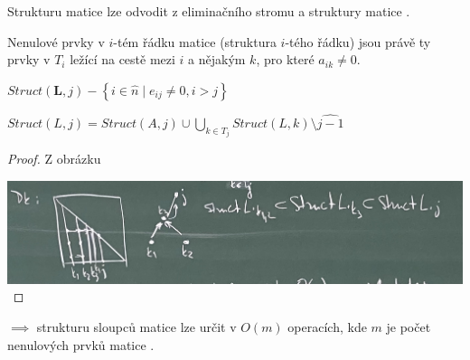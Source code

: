 \documentclass[../main.tex]{subfiles}
\begin{document}
\begin{corollary}
    Strukturu matice \matL lze odvodit z eliminačního stromu a struktury matice \matA . 

    Nenulové prvky v $i$-tém řádku matice \matL (struktura $i$-tého řádku) jsou právě
    ty prvky v $T_i$ ležící na cestě mezi $i$ a nějakým $k$, pro které $a_{ik} \neq 0$.
\end{corollary}

\begin{definition}
    $Struct(\mathbf{L}, j) - \left\{  i\in \hat{n}\mid e_{ij} \neq 0, i>j \right\}$
\end{definition}

\begin{theorem}
    $Struct(L,j) = Struct(A,j) \cup \bigcup_{k\in T_j} Struct (L, k)\setminus \widehat{j-1}$
\end{theorem}

\begin{proof}
    Z obrázku

    \includegraphics[width=0.9\linewidth]{images/19-10-dukazfinal.jpg}
\end{proof}



$\implies$ strukturu sloupců matice \matL lze určit v $O(m)$ operacích, kde $m$ je počet nenulových prvků matice \matL . 
\end{document}

